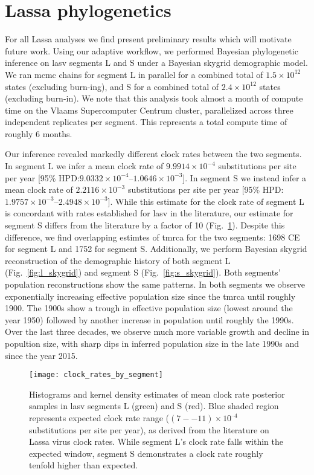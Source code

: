 \section{Lassa phylogenetics}

For all Lassa analyses we find present preliminary results which will motivate future work.
Using our adaptive workflow, we performed Bayesian phylogenetic inference on \gls{lasv} segments L and S under a Bayesian skygrid demographic model.
We ran \gls{mcmc} chains for segment L in parallel for a combined total of $1.5\times10^{12}$ states (excluding burn-ing), and S for a combined total of $2.4\times10^{12}$ states (excluding burn-in).
We note that this analysis took almost a month of compute time on the Vlaams Supercomputer Centrum cluster, parallelized across three independent replicates per segment.
This represents a total compute time of roughly 6 months.

Our inference revealed markedly different clock rates between the two segments.
In segment L we infer a mean clock rate of $9.9914\times10^{-4}$ substitutions per site per year [95\% HPD:$9.0332\times10^{-4}$--$1.0646\times10^{-3}$].
In segment S we instead infer a mean clock rate of $2.2116\times10^{-3}$ substitutions per site per year [95\% HPD:$1.9757\times10^{-3}$--$2.4948\times10^{-3}$].
While this estimate for the clock rate of segment L is concordant with rates established for \gls{lasv} in the literature\cite{andersen2015clinical, fichet2016spatial}, our estimate for segment S differs from the literature by a factor of 10 (Fig.~\ref{fig:lassa_clock_rates}).
Despite this difference, we find overlapping estimtes of \gls{tmrca} for the two segments: 1698 CE for segment L and 1752 for segment S.
Additionally, we perform Bayesian skygrid reconstruction of the demographic history of both segment L (Fig.~\ref{fig:l_skygrid}) and segment S (Fig.~\ref{fig:s_skygrid}).
Both segments' population reconstructions show the same patterns.
In both segments we observe exponentially increasing effective population size since the \gls{tmrca} until roughly 1900.
The 1900s show a trough in effective population size (lowest around the year 1950) followed by another increase in population until roughly the 1990s.
Over the last three decades, we observe much more variable growth and decline in popultion size, with sharp dips in inferred population size in the late 1990s and since the year 2015.

\begin{figure}[ht]
  \centering
  \medskip
  \texttt{[image: clock\_rates\_by\_segment]}
  \caption[LASV clock rates by segment]{Histograms and kernel density estimates of mean clock rate posterior samples in \gls{lasv} segments L (green) and S (red). Blue shaded region represents expected clock rate range ($(7--11)\times10^{–4}$ substitutions per site per year), as derived from the literature on Lassa virus clock rates\cite{andersen2015clinical, fichet2016spatial}. While segment L's clock rate falls within the expected window, segment S demonstrates a clock rate roughly tenfold higher than expected.}
  \label{fig:lassa_clock_rates}
\end{figure}

